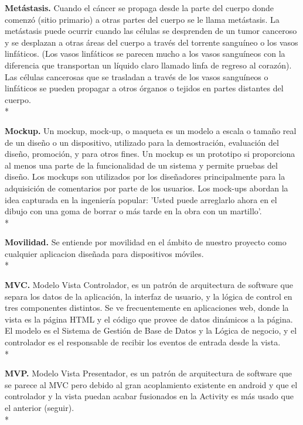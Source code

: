 \documentclass[../pfc.tex]{subfiles}
\begin{document}
	\textbf{Metástasis.}
	Cuando el cáncer se propaga desde la parte del cuerpo donde comenzó (sitio primario) a otras partes del cuerpo se le llama metástasis. La metástasis puede ocurrir cuando las células se desprenden de un tumor canceroso y se desplazan a otras áreas del cuerpo a través del torrente sanguíneo o los vasos linfáticos. (Los vasos linfáticos se parecen mucho a los vasos sanguíneos con la diferencia que transportan un líquido claro llamado linfa de regreso al corazón). Las células cancerosas que se trasladan a través de los vasos sanguíneos o linfáticos se pueden propagar a otros órganos o tejidos en partes distantes del cuerpo.\cite{metastasis}\\*\
	
	\textbf{Mockup.}
	Un mockup, mock-up, o maqueta es un modelo a escala o tamaño real de un diseño o un dispositivo, utilizado para la demostración, evaluación del diseño, promoción, y para otros fines. Un mockup es un prototipo si proporciona al menos una parte de la funcionalidad de un sistema y permite pruebas del diseño.
	Los mockups son utilizados por los diseñadores principalmente para la adquisición de comentarios por parte de los usuarios. Los mock-ups abordan la idea capturada en la ingeniería popular: 'Usted puede arreglarlo ahora en el dibujo con una goma de borrar o más tarde en la obra con un martillo'.\\*
	
	\textbf{Movilidad.}
	Se entiende por movilidad en el ámbito de nuestro proyecto como cualquier aplicacion diseñada para dispositivos móviles.\\*
	
	\textbf{MVC.}
	Modelo Vista Controlador, es un patrón de arquitectura de software que separa los datos de la aplicación, la interfaz de usuario, y la lógica de control en tres componentes distintos. Se ve frecuentemente en aplicaciones web, donde la vista es la página HTML y el código que provee de datos dinámicos a la página. El modelo es el Sistema de Gestión de Base de Datos y la Lógica de negocio, y el controlador es el responsable de recibir los eventos de entrada desde la vista.\\*
	
	\textbf{MVP.}
	Modelo Vista Presentador, es un patrón de arquitectura de software que se parece al MVC pero debido al gran acoplamiento existente en android y que el controlador y la vista puedan acabar fusionados en la Activity es más usado que el anterior (seguir).\\*
	
\end{document}
